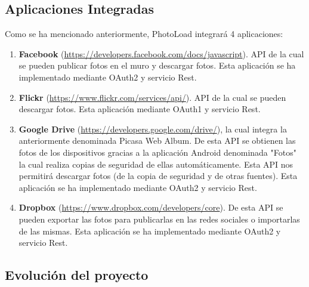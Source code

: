\documentclass{scrartcl}
\begin{document}

\subsection{Aplicaciones Integradas}\label{cap:APIs Integradas}
Como se ha mencionado anteriormente, PhotoLoad integrará 4 aplicaciones:
\begin{enumerate}[\textbf{\textperiodcentered}]
	\item \textbf{Facebook} (\url{https://developers.facebook.com/docs/javascript}). API de la cual se pueden publicar fotos en el muro y descargar fotos. Esta aplicación se ha implementado mediante OAuth2 y servicio Rest.
	\item \textbf{Flickr} (\url{https://www.flickr.com/services/api/}). API de la cual se pueden descargar fotos. Esta aplicación mediante OAuth1 y servicio Rest.
	\item \textbf{Google Drive} (\url{https://developers.google.com/drive/}), la cual integra la anteriormente denominada Picasa Web Album. De esta API se obtienen las fotos de los dispositivos gracias a la aplicación Android denominada "Fotos" la cual realiza copias de seguridad de ellas automáticamente. Esta API nos permitirá descargar fotos (de la copia de seguridad y de otras fuentes). Esta aplicación se ha implementado mediante OAuth2 y servicio Rest.
	\item \textbf{Dropbox} (\url{https://www.dropbox.com/developers/core}). De esta API se pueden exportar las fotos para publicarlas en las redes sociales o importarlas de las mismas. Esta aplicación se ha implementado mediante OAuth2 y servicio Rest.
	
\end{enumerate}
\subsection{Evolución del proyecto}\label{cap:problemas encontrados}
\end{document}
